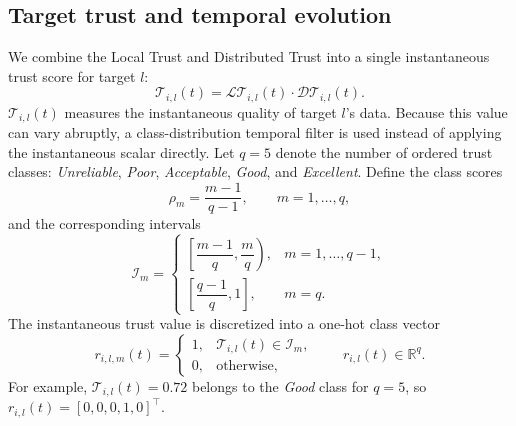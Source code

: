 \documentclass[journal,twoside]{IEEEtran}
\def\LT{\mathcal{LT}} %
\def\DT{\mathcal{DT}} %
\def\T{\mathcal{T}} %
\begin{document}
\subsection{Target trust and temporal evolution}\label{subsec_evolution}
We combine the Local Trust and Distributed Trust into a single instantaneous trust score for target $l$:
\begin{equation}
    \T_{i,l}(t) =  \LT_{i,l}(t) \cdot \DT_{i,l}(t).
    \label{trs_sample_genral}
\end{equation}
$\T_{i,l}(t)$ measures the instantaneous quality of target $l$'s data.
Because this value can vary abruptly, a class-distribution temporal filter is used instead of applying the instantaneous scalar directly.
Let $q=5$ denote the number of ordered trust classes:
\textit{Unreliable}, \textit{Poor}, \textit{Acceptable}, \textit{Good}, and \textit{Excellent}.
Define the class scores
\begin{equation}
    \rho_m=\frac{m-1}{q-1}, \qquad m=1,\ldots,q,
\end{equation}
and the corresponding intervals
\begin{equation}
    \mathcal{I}_m =
    \begin{cases}
    \left[\dfrac{m-1}{q},\dfrac{m}{q}\right), & m=1,\ldots,q-1,\\[1ex]
    \left[\dfrac{q-1}{q},1\right], & m=q.
    \end{cases}
\end{equation}
The instantaneous trust value is discretized into a one-hot class vector
\begin{equation}
    r_{i,l,m}(t)=
    \begin{cases}
    1, & \T_{i,l}(t)\in \mathcal{I}_m,\\
    0, & \text{otherwise,}
    \end{cases}
    \qquad
    r_{i,l}(t)\in\mathbb{R}^{q}.
\end{equation}
For example, $\T_{i,l}(t)=0.72$ belongs to the \textit{Good} class for $q=5$, so $r_{i,l}(t)=[0,0,0,1,0]^\top$.
\end{document}

